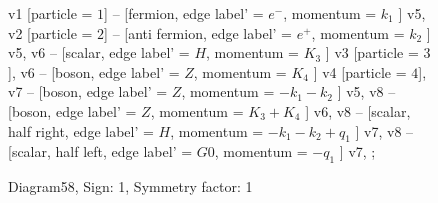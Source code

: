 \documentclass{revtex4}
\begin{document}
\begin{figure}[!htb]
\begin{center}
{    %
v1 [particle = \(1\)] -- [fermion, edge label' = \(e^{-}\), momentum = \(k_{1}\) ] v5, 
v2 [particle = \(2\)] -- [anti fermion, edge label' = \(e^{+}\), momentum = \(k_{2}\) ] v5, 
v6 -- [scalar, edge label' = \(H\), momentum = \(K_{3}\) ] v3 [particle = \(3\)], 
v6 -- [boson, edge label' = \(Z\), momentum = \(K_{4}\) ] v4 [particle = \(4\)], 
v7 -- [boson, edge label' = \(Z\), momentum = \(-k_{1} - k_{2}\) ] v5, 
v8 -- [boson, edge label' = \(Z\), momentum = \(K_{3} + K_{4}\) ] v6, 
v8 -- [scalar, half right, edge label' = \(H\), momentum = \(-k_{1} - k_{2} + q_{1}\) ] v7, 
v8 -- [scalar, half left, edge label' = \(G0\), momentum = \(-q_{1}\) ] v7, 
};
\end{center}
\caption{Diagram58, Sign: 1, Symmetry factor: 1}
\end{figure}
\newpage
\end{document}

